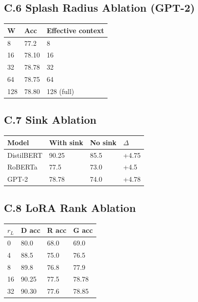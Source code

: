 \subsection{C.6 Splash Radius Ablation (GPT-2)}

\begin{table}[H]
\centering
\small
\begin{tabular}{lll}
\toprule
\textbf{W} & \textbf{Acc} & \textbf{Effective context} \\
\midrule
8 & 77.2 & 8 \\
16 & 78.10 & 16 \\
32 & 78.78 & 32 \\
64 & 78.75 & 64 \\
128 & 78.80 & 128 (full) \\
\bottomrule
\end{tabular}
\end{table}

\subsection{C.7 Sink Ablation}

\begin{table}[H]
\centering
\small
\begin{tabular}{llll}
\toprule
\textbf{Model} & \textbf{With sink} & \textbf{No sink} & \textbf{$\Delta$} \\
\midrule
DistilBERT & 90.25 & 85.5 & +4.75 \\
RoBERTa & 77.5 & 73.0 & +4.5 \\
GPT-2 & 78.78 & 74.0 & +4.78 \\
\bottomrule
\end{tabular}
\end{table}

\subsection{C.8 LoRA Rank Ablation}

\begin{table}[H]
\centering
\small
\begin{tabular}{llll}
\toprule
\textbf{$r_L$} & \textbf{D acc} & \textbf{R acc} & \textbf{G acc} \\
\midrule
0 & 80.0 & 68.0 & 69.0 \\
4 & 88.5 & 75.0 & 76.5 \\
8 & 89.8 & 76.8 & 77.9 \\
16 & 90.25 & 77.5 & 78.78 \\
32 & 90.30 & 77.6 & 78.85 \\
\bottomrule
\end{tabular}
\end{table}

